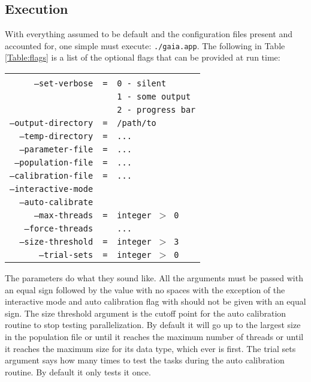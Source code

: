 \documentclass[10pt,a4paper,final]{article}
\numberwithin{equation}{section}
\newenvironment{Table}
  {\par\bigskip\noindent\minipage{\columnwidth}\centering}
    {\endminipage\par\bigskip}
\begin{document}
\begin{multicols}{2}[]
		\subsection{Execution}

			With everything assumed to be default and the configuration files present and
			accounted for, one simple must execute: \texttt{./gaia.app}. The following in
			Table \ref{Table:flags} is a list of the optional flags that can be provided 
			at run time:

			\begin{Table}
			\begin{tabular}{rcl} \hline\hline
				& & \\
				\texttt{--set-verbose} & \texttt{=} & \texttt{0 - silent} \\
				& & \texttt{1 - some output} \\
				& & \texttt{2 - progress bar} \\
				\texttt{--output-directory} & \texttt{=} & \texttt{/path/to} \\
				\texttt{--temp-directory}   & \texttt{=} & \texttt{...}\\
				\texttt{--parameter-file}   & \texttt{=} & \texttt{...}\\
				\texttt{--population-file}  & \texttt{=} & \texttt{...}\\
				\texttt{--calibration-file} & \texttt{=} & \texttt{...}\\
				\texttt{--interactive-mode} & & \\
				\texttt{--auto-calibrate}   & & \\
				\texttt{--max-threads}      & \texttt{=} & \texttt{integer $>$ 0} \\
				\texttt{--force-threads}    & & \texttt{...}\\
				\texttt{--size-threshold}   & \texttt{=} & \texttt{integer $>$ 3}\\
				\texttt{--trial-sets}       & \texttt{=} & \texttt{integer $>$ 0}
			\end{tabular}
			\label{Table:flags}
			\end{Table}
			
			The parameters do what they sound like. All the arguments must be
			passed with an equal sign followed by the value with no spaces
			with the exception of the interactive mode and auto calibration
			flag with should not be given with an equal sign. The size threshold
			argument is the cutoff point for the auto calibration routine to 
			stop testing parallelization. By default it will go up to the largest
			size in the population file or until it reaches the maximum number
			of threads or until it reaches the maximum size for its data type,
			which ever is first. The trial sets argument says how many times
			to test the tasks during the auto calibration routine. By default it
			only tests it once.


\end{multicols}
\end{document}

